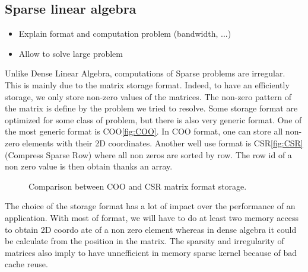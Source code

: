 \subsection{Sparse linear algebra}

  \begin{itemize}
    \item Explain format and computation problem (bandwidth, ...)
    \item Allow to solve large problem
  \end{itemize}


Unlike Dense Linear Algebra, computations of Sparse problems are irregular.
%
This is mainly due to the matrix storage format.
%
Indeed, to have an efficiently storage, we only store non-zero values of the matrices.
%
The non-zero pattern of the matrix is define by the problem we tried to resolve.
%
Some storage format are optimized for some class of problem, but there is also very generic format.
%
One of the most generic format is COO\ref{fig:COO}.
%
In COO format, one can store all non-zero elements with their 2D coordinates.
%
Another well use format is CSR\ref{fig:CSR} (Compress Sparse Row) where all non zeros are sorted by row.
%
The row id of a non zero value is then obtain thanks an array.

\begin{figure}[!ht]
     \begin{center}
    \end{center}
    \caption{Comparison between COO and CSR matrix format storage.}
    \label{fig:matrix_storage}
\end{figure}

The choice of the storage format has a lot of impact over the performance of an application.
%
With most of format, we will have to do at least two memory access to obtain 2D coordo ate of a non zero element whereas in dense algebra it could be calculate from the position in the matrix.
%
The sparsity and irregularity of matrices also imply to have unnefficient in memory sparse kernel because of bad cache reuse.
